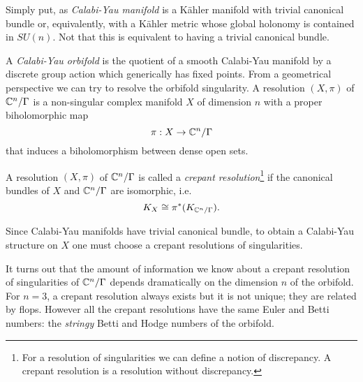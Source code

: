 \documentclass[a4paper,11pt]{article}
\begin{document}
    Simply put, as \emph{Calabi-Yau manifold} is a Kähler manifold with trivial canonical bundle or, equivalently, with a Kähler metric whose global holonomy is contained in $SU(n)$. Not that this is equivalent to having a trivial canonical bundle.

     A \emph{Calabi-Yau orbifold} is the quotient of a smooth Calabi-Yau manifold by a discrete group action which generically has fixed points. From a geometrical perspective we can try to resolve the orbifold singularity. A resolution $(X,\pi)$ of $\mathbb{C}^n/\Gamma$ is a non-singular complex manifold $X$ of dimension $n$ with a proper biholomorphic map 
    \begin{equation}
        \pi:X\to\mathbb{C}^n/\Gamma
    \end{equation}
    that induces a biholomorphism between dense open sets. 
    \begin{defn}
        A resolution $(X,\pi)$ of $\mathbb{C}^n/\Gamma$ is called a \emph{crepant resolution}\footnote{For a resolution of singularities we can define a notion of discrepancy. A crepant resolution is a resolution
        without discrepancy.} if the canonical bundles of $X$ and $\mathbb{C}^n/\Gamma$ are isomorphic, i.e.
        \begin{equation*}
            K_X\cong\pi^*(K_{\mathbb{C}^n/\Gamma}).
        \end{equation*}
    \end{defn}
    Since Calabi-Yau manifolds have trivial canonical bundle, to obtain a Calabi-Yau structure on $X$ one must choose a crepant resolutions of singularities.

    It turns out that the amount of information we know about a crepant resolution of singularities of $\mathbb{C}^n/\Gamma$ depends dramatically on the dimension $n$ of the orbifold. For $n=3$, a crepant resolution always exists but it is not unique; they are related by flops. However all the crepant resolutions have the same Euler and Betti numbers: the \emph{stringy} Betti and Hodge numbers of the orbifold.

\pagebreak

\listofmarker
{}

\pagebreak

\printbibliography
\end{document}
